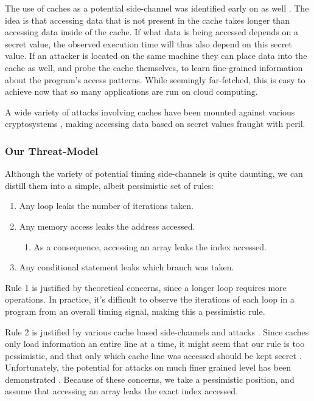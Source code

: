 \documentclass[11pt, a4paper]{article} %
\begin{document}
{The use of caches as a potential side-channel was
identified early on as well \cite{page_theoretical_2002}.
The idea is that accessing data that is not present in the cache
takes longer than accessing data inside of the cache. If what data
is being accessed depends on a secret value, the observed execution
time will thus also depend on this secret value. If an attacker is located
on the same machine they can place data into the cache as well, and probe
the cache themselves, to learn fine-grained information about the
program's access patterns. While seemingly far-fetched, this is easy
to achieve now that so many applications are run on cloud computing.

A wide variety of attacks involving caches have been mounted
against various cryptosystems
\cite{
  bernstein_cache-timing_2005,
  yarom_cachebleed_2017,
  cabrera_aldaya_cache-timing_2019}
, making accessing data based on secret
values fraught with peril.

\subsubsection{Our Threat-Model}
\label{threat_model}

Although the variety of potential timing side-channels is quite daunting,
we can distill them into a simple, albeit pessimistic set of rules:

\begin{enumerate}
  \item Any loop leaks the number of iterations taken.
  \item Any memory access leaks the address accessed.
  \begin{enumerate}
    \item As a consequence, accessing an array leaks the index accessed.
  \end{enumerate}
  \item Any conditional statement leaks which branch was taken.
\end{enumerate}

Rule 1 is justified by theoretical concerns, since a longer loop
requires more operations. In practice, it's difficult to observe
the iterations of each loop in a program from an overall timing signal,
making this a pessimistic rule.

Rule 2 is justified by various cache based side-channels and attacks
\cite{
  bernstein_cache-timing_2005,
  yarom_cachebleed_2017,
  cabrera_aldaya_cache-timing_2019}.
Since caches only load information an entire line at a time, it might
seem that our rule is too pessimistic, and that only which cache line
was accessed should be kept secret \cite{brickell_technologies_2011}.
Unfortunately, the potential for attacks on much finer grained
level has been demonstrated
\cite{
  bernstein_word_2013,
  osvik_cache_2006,
  yarom_cachebleed_2017}.
Because of these concerns, we take a pessimistic position, and assume
that accessing an array leaks the exact index accessed.


}
\end{document}

